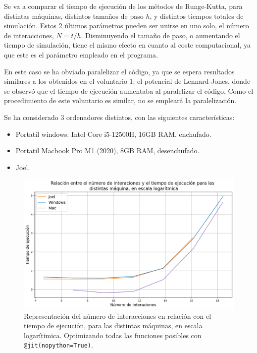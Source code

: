 \documentclass[11pt, twoside]{article} %
\begin{document}
Se va a comparar el tiempo de ejecución de los métodos de Runge-Kutta, para 
distintas máquinas, distintos tamaños de paso $h$, y distintos tiempos totales
de simulación. Estos 2 últimos parámetros pueden ser unirse en uno solo, 
el número de interacciones, $N = t/h$. Disminuyendo el tamaño de paso, o 
aumentando el tiempo de simulación, tiene el mismo efecto en cuanto al coste
computacional, ya que este es el parámetro empleado en el programa.

En este caso se ha obviado paralelizar el código, ya que se espera resultados similares
a los obtenidos en el voluntario 1: el potencial de Lennard-Jones, donde se observó 
que el tiempo de ejecución aumentaba al paralelizar el código. Como el procedimiento de
este voluntario es similar, no se empleará la paralelización.

Se ha considerado 3 ordenadores distintos, con las siguientes características:
\begin{itemize}
    \item Portatil windows: Intel Core i5-12500H, 16GB RAM, enchufado.
    \item Portatil Macbook Pro M1 (2020), 8GB RAM, desenchufado.
    \item Joel.
\end{itemize}

\begin{figure}[h!]
    \centering
    \includegraphics[width=\linewidth]{plots/optimizacion.png}
    \caption{Representación del número de interacciones en relación con el tiempo 
    de ejecución, para las distintas máquinas, en escala logarítimica. Optimizando
    todas las funciones posibles con \texttt{@jit(nopython=True)}.}
    \label{fig:optimizacion}
\end{figure}
\end{document}
